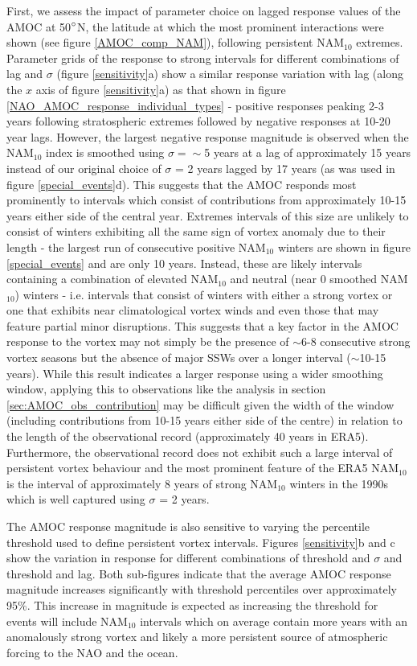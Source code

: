 First, we assess the impact of parameter choice on lagged response values of the AMOC at 50$\degree$N, the latitude at which the most prominent interactions were shown (see figure \ref{AMOC_comp_NAM}), following persistent NAM$_{10}$ extremes. Parameter grids of the response to strong intervals for different combinations of lag and $\sigma$ (figure \ref{sensitivity}a) show a similar response variation with lag (along the $x$ axis of figure \ref{sensitivity}a) as that shown in figure \ref{NAO_AMOC_response_individual_types} - positive responses peaking 2-3 years following stratospheric extremes followed by negative responses at 10-20 year lags. However, the largest negative response magnitude is observed when the NAM$_{10}$ index is smoothed using $\sigma = \sim$5 years at a lag of approximately 15 years instead of our original choice of $\sigma$ = 2 years lagged by 17 years (as was used in figure \ref{special_events}d). This suggests that the AMOC responds most prominently to intervals which consist of contributions from approximately 10-15 years either side of the central year. Extremes intervals of this size are unlikely to consist of winters exhibiting all the same sign of vortex anomaly due to their length - the largest run of consecutive positive NAM$_{10}$ winters are shown in figure \ref{special_events} and are only 10 years. Instead, these are likely intervals containing a combination of elevated NAM$_{10}$ and neutral (near 0 smoothed NAM$_{10}$) winters - i.e. intervals that consist of winters with either a strong vortex or one that exhibits near climatological vortex winds and even those that may feature partial minor disruptions. This suggests that a key factor in the AMOC response to the vortex may not simply be the presence of $\sim$6-8 consecutive strong vortex seasons but the absence of major SSWs over a longer interval ($\sim$10-15 years). While this result indicates a larger response using a wider smoothing window, applying this to observations like the analysis in section \ref{sec:AMOC_obs_contribution} may be difficult given the width of the window (including contributions from 10-15 years either side of the centre) in relation to the length of the observational record (approximately 40 years in ERA5). Furthermore, the observational record does not exhibit such a large interval of persistent vortex behaviour and the most prominent feature of the ERA5 NAM$_{10}$ is the interval of approximately 8 years of strong NAM$_{10}$ winters in the 1990s which is well captured using $\sigma$ = 2 years. 

The AMOC response magnitude is also sensitive to varying the percentile threshold used to define persistent vortex intervals. Figures \ref{sensitivity}b and c show the variation in response for different combinations of threshold and $\sigma$ and threshold and lag. Both sub-figures indicate that the average AMOC response magnitude increases significantly with threshold percentiles over approximately 95\%. This increase in magnitude is expected as increasing the threshold for events will include NAM$_{10}$ intervals which on average contain more years with an anomalously strong vortex and likely a more persistent source of atmospheric forcing to the NAO and the ocean. 

